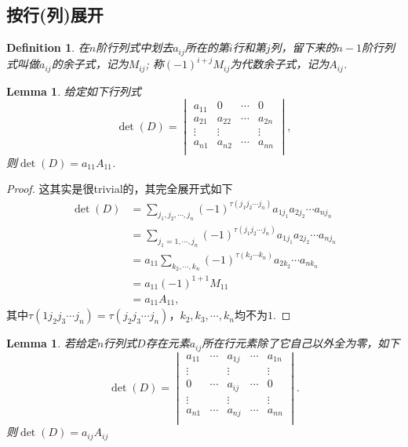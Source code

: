 \documentclass{article}
\newtheorem{lemma}[theorem]{Lemma}
\newtheorem{definition}[theorem]{Definition}
\begin{document}
\newpage
\subsection{按行(列)展开}
\begin{definition}
\rm 在$n$阶行列式中划去$a_{ij}$所在的第$i$行和第$j$列，留下来的$n-1$阶行列式叫做$a_{ij}$的{\color{red}余子式}，记为$M_{ij}$; 称$(-1)^{i+j}M_{ij}$为{\color{red}代数余子式}，记为$A_{ij}$.
\end{definition}

\begin{lemma}
\rm 给定如下行列式
$$
\det(D)=
\begin{vmatrix}
a_{11} & 0 & \cdots & 0 \\
a_{21} & a_{22} & \cdots & a_{2n}\\
\vdots & \vdots &	&\vdots \\
a_{n1} & a_{n2} & \cdots & a_{nn}\\
\end{vmatrix},
$$
则$\det(D) = a_{11}A_{11}$.
\end{lemma}

\begin{proof}
这其实是很trivial的，其完全展开式如下
$$
\begin{array}{ll}
\det(D) &= \sum\limits_{j_1,j_2,\cdots,j_n} (-1)^{\tau(j_1j_2\cdots j_n)}a_{1j_1}a_{2j_2}\cdots a_{nj_n} \\
&= \sum\limits_{j_1=1,\cdots,j_n} (-1)^{\tau(j_1j_2\cdots j_n)}a_{1j_1}a_{2j_2}\cdots a_{nj_n} \\
&= a_{11} \sum\limits_{k_2,\cdots,k_n} (-1)^{\tau(k_2\cdots k_n)}a_{2k_2}\cdots a_{nk_n} \\
&= a_{11}(-1)^{1+1}M_{11}\\
&= a_{11}A_{11},
\end{array}
$$
其中$\tau(1j_2j_3\cdots j_n) = \tau(j_2j_3\cdots j_n)$，$k_2,k_3,\cdots,k_n$均不为$1$.
\end{proof}

\begin{lemma}
\rm 若给定$n$行列式$D$存在元素$a_{ij}$所在行元素除了它自己以外全为零，如下
$$
\det(D)=
\begin{vmatrix}
a_{11} & \cdots & a_{1j} & \cdots & a_{1n}\\
\vdots & & \vdots & & \vdots \\
0	& \cdots & a_{ij} & \cdots & 0 \\
\vdots & &\vdots & &\vdots \\
a_{n1} & \cdots & a_{nj} & \cdots & a_{nn} \\ 
\end{vmatrix}.
$$ 
则$\det(D)=a_{ij}A_{ij}$
\end{lemma}
\end{document}

